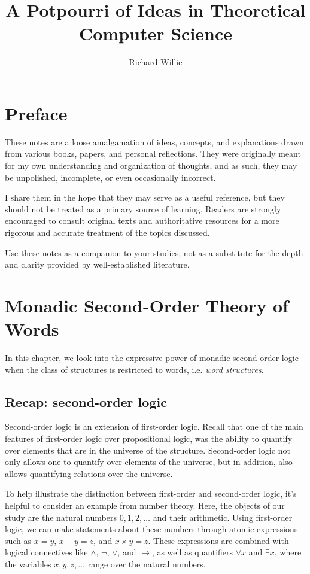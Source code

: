 \documentclass[11pt,twoside=off,numbers=noenddot]{scrbook}
\title{A Potpourri of Ideas in Theoretical Computer Science}
\author{Richard Willie}
\begin{document}
\maketitle

\chapter*{Preface}
These notes are a loose amalgamation of ideas, concepts, and
explanations drawn from various books, papers, and personal
reflections. They were originally meant for my own understanding and
organization of thoughts, and as such, they may be unpolished,
incomplete, or even occasionally incorrect.

I share them in the hope that they may serve as a useful reference,
but they should not be treated as a primary source of learning.
Readers are strongly encouraged to consult original texts and
authoritative resources for a more rigorous and accurate treatment of
the topics discussed.

Use these notes as a companion to your studies, not as a substitute
for the depth and clarity provided by well-established literature.

\tableofcontents

\newpage

\chapter{Monadic Second-Order Theory of Words}
In this chapter, we look into the expressive power of monadic
second-order logic when the class of structures is restricted to
words, i.e. \emph{word structures}.

\section{Recap: second-order logic}
Second-order logic is an extension of first-order logic. Recall that
one of the main features of first-order logic over propositional
logic, was the ability to quantify over elements that are in the
universe of the structure. Second-order logic not only allows one to
quantify over elements of the universe, but in addition, also allows
quantifying relations over the universe.

To help illustrate the distinction between first-order and
second-order logic, it's helpful to consider an example from number
theory. Here, the objects of our study are the natural numbers $0, 1,
2, \dots$ and their arithmetic. Using first-order logic, we can make
statements about these numbers through atomic expressions such as $x
= y$, $x + y = z$, and $x \times y = z$. These expressions are
combined with logical connectives like $\wedge$, $\neg$, $\vee$, and
$\rightarrow$, as well as quantifiers $\forall x$ and $\exists x$,
where the variables $x, y, z, \dots$ range over the natural numbers.
\end{document}

